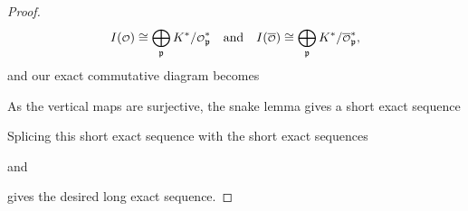 \begin{proof}
      \[
        I(\smc{O}) \cong \bigop_{\mf{p}}K^{\ast}/\smc{O}_{\mf{p}}^{\ast} \quad \text{and} \quad I(\conj{\smc{O}}) \cong \bigop_{\mf{p}}K^{\ast}/\conj{\smc{O}}_{\mf{p}}^{\ast},
      \]
      and our exact commutative diagram becomes
      \begin{center}
      \end{center}
      As the vertical maps are surjective, the snake lemma gives a short exact sequence
      \begin{center}
      \end{center}
      Splicing this short exact sequence with the short exact sequences
      \begin{center}
      \end{center}
      and
      \begin{center}
      \end{center}
      gives the desired long exact sequence.
    \end{proof}

